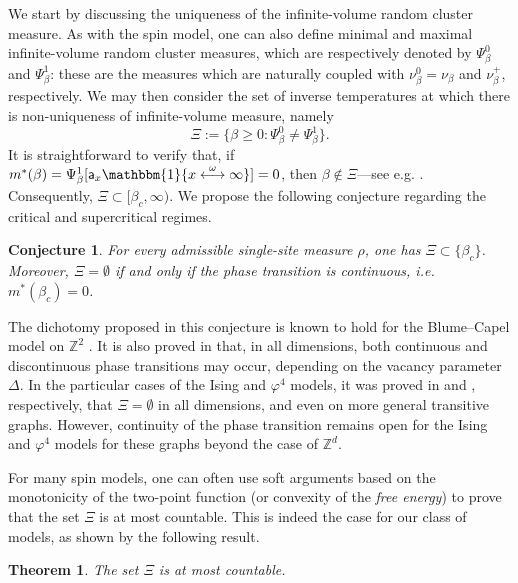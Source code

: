 \documentclass[11pt,a4paper]{article}
\numberwithin{equation}{section}
\theoremstyle{plain}
\newtheorem{Thm}{Theorem}[section]
\newtheorem{Conj}{Conjecture}
\theoremstyle{definition}
\begin{document}
We start by discussing the uniqueness of the infinite-volume random cluster measure.  As with the spin model, one can also define minimal and maximal infinite-volume random cluster measures, which are respectively denoted by $\Psi^0_\beta$ and $\Psi^1_\beta$: these are the measures which are naturally coupled with $\nu^0_\beta=\nu_\beta$ and $\nu^+_\beta$, respectively. 
We may then consider the set of inverse temperatures at which there is non-uniqueness of infinite-volume measure, namely
\begin{equation*}
	\Xi:=\{\beta\geq0 : \Psi^0_\beta \neq \Psi^1_\beta\}.
\end{equation*}
It is straightforward to verify that, if $m^*(\beta)=\Psi^1_\beta[\mathsf{a}_x \mathbbm{1}\{x \overset{\omega}{\longleftrightarrow} \infty\}]=0$, then $\beta\notin \Xi$---see e.g. \cite[Proposition C.2]{GunaratnamPanagiotisPanisSeveroPhi42022}. Consequently, $\Xi\subset [\beta_c,\infty)$. We propose the following conjecture regarding the critical and supercritical regimes.
\begin{Conj}\label{conj:uniqueness_Gibbs}
	For every admissible single-site measure $\rho$, one has $\Xi\subset \{\beta_c\}$. Moreover, $\Xi=\emptyset$ if and only if the phase transition is continuous, i.e.~$m^*(\beta_c)=0$.
\end{Conj}


The dichotomy proposed in this conjecture is known to hold for the Blume--Capel model on $\mathbb{Z}^2$ \cite{GKP24}. It is also proved in \cite{GKP24} that, in all dimensions, both continuous and discontinuous phase transitions may occur, depending on the vacancy parameter $\Delta$.  In the particular cases of the Ising and $\varphi^4$ models, it was proved in \cite{RaoufiGibbsMeasures} and \cite{GunaratnamPanagiotisPanisSeveroPhi42022}, respectively, that $\Xi=\emptyset$ in all dimensions, and even on more general transitive graphs.  However, continuity of the phase transition remains open for the Ising and $\varphi^4$ models for these graphs beyond the case of $\mathbb{Z}^d$. 


 

For many spin models, one can often use soft arguments based on the monotonicity of the two-point function (or convexity of the \emph{free energy}) to prove that the set $\Xi$ is at most countable. This is indeed the case for our class of models, as shown by the following result.

\begin{Thm}\label{thm:full-space uniqueness}
	The set $\Xi$ is at most countable. 
\end{Thm}
\end{document}
